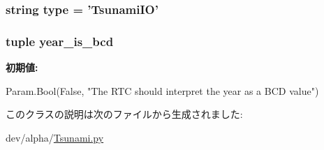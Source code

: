 \label{classTsunami_1_1TsunamiIO_aabfaa1eda1546a625690c7a59b7fed04}
\hypertarget{classTsunami_1_1TsunamiIO_acce15679d830831b0bbe8ebc2a60b2ca}{
\subsubsection[{type}]{\setlength{\rightskip}{0pt plus 5cm}string {\bf type} = '{\bf TsunamiIO}'}}
\label{classTsunami_1_1TsunamiIO_acce15679d830831b0bbe8ebc2a60b2ca}
\hypertarget{classTsunami_1_1TsunamiIO_aaec21bf266d8a17759fe4f5bf79b06fb}{
\subsubsection[{year\_\-is\_\-bcd}]{\setlength{\rightskip}{0pt plus 5cm}tuple {\bf year\_\-is\_\-bcd}}}
\label{classTsunami_1_1TsunamiIO_aaec21bf266d8a17759fe4f5bf79b06fb}
{\bfseries 初期値:}
\begin{DoxyCode}
Param.Bool(False,
        "The RTC should interpret the year as a BCD value")
\end{DoxyCode}


このクラスの説明は次のファイルから生成されました:\begin{DoxyCompactItemize}
\item 
dev/alpha/\hyperlink{Tsunami_8py}{Tsunami.py}\end{DoxyCompactItemize}
